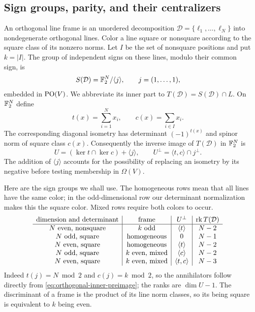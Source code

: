 \subsection{Sign groups, parity, and their centralizers}

An orthogonal line frame is an unordered decomposition
$\mathcal D=\{\ell_1,\ldots,\ell_N\}$ into nondegenerate orthogonal
lines.  Color a line square or nonsquare according to the square class
of its nonzero norms.  Let $I$ be the set of nonsquare positions and put
$k=|I|$.  The group of independent signs on these lines, modulo their
common sign, is
\[
 S(\mathcal D)=\mathbb F_2^N/\langle j\rangle,
 \qquad j=(1,\ldots,1),
\]
embedded in $\operatorname{PO}(V)$.  We abbreviate its inner part to
$T(\mathcal D)=S(\mathcal D)\cap L$.  On $\mathbb F_2^N$ define
\[
 t(x)=\sum_{i=1}^N x_i,\qquad c(x)=\sum_{i\in I}x_i.
\]
The corresponding diagonal isometry has determinant $(-1)^{t(x)}$ and
spinor norm of square class $c(x)$.  Consequently the inverse image of
$T(\mathcal D)$ in $\mathbb F_2^N$ is
\begin{equation}\label{eq:orthogonal-inner-preimage}
 U=(\ker t\cap\ker c)+\langle j\rangle,
 \qquad
 U^\perp=\langle t,c\rangle\cap j^\perp.
\end{equation}
The addition of $\langle j\rangle$ accounts for the possibility of
replacing an isometry by its negative before testing membership in
$\Omega(V)$.

Here are the sign groups we shall use.  The homogeneous rows mean that
all lines have the same color; in the odd-dimensional row our determinant
normalization makes this the square color.  Mixed rows require both
colors to occur.
\begin{equation}\label{eq:orthogonal-rank-table}
\begin{array}{c|c|c|c}
\text{dimension and determinant}&\text{frame}&U^\perp&\operatorname{rk} T(\mathcal D)\\ \hline
N\text{ even, nonsquare}&k\text{ odd}&\langle t\rangle&N-2\\
N\text{ odd, square}&\text{homogeneous}&0&N-1\\
N\text{ even, square}&\text{homogeneous}&\langle t\rangle&N-2\\
N\text{ odd, square}&k\text{ even, mixed}&\langle c\rangle&N-2\\
N\text{ even, square}&k\text{ even, mixed}&\langle t,c\rangle&N-3
\end{array}
\end{equation}
Indeed $t(j)=N\bmod2$ and $c(j)=k\bmod2$, so the annihilators follow
directly from \eqref{eq:orthogonal-inner-preimage}; the ranks are
$\dim U-1$.  The discriminant of a frame is the product of its line
norm classes, so its being square is equivalent to $k$ being even.

